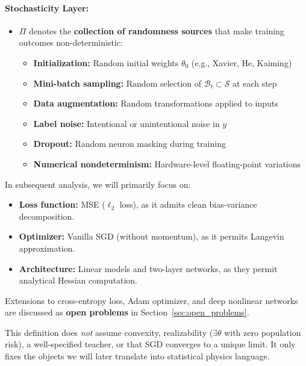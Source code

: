 \documentclass[
  journal=largetwo,
  year=2025,
  volume=37,
]{cup-journal}
\begin{document}
\begin{setting}
\paragraph{Stochasticity Layer:}
\begin{itemize}
    \item $\Pi$ denotes the \textbf{collection of randomness sources} that make training outcomes non-deterministic:
    \begin{itemize}
        \item \textbf{Initialization:} Random initial weights $\theta_0$ (e.g., Xavier, He, Kaiming)
        \item \textbf{Mini-batch sampling:} Random selection of $\mathcal{B}_t \subset \mathcal{S}$ at each step
        \item \textbf{Data augmentation:} Random transformations applied to inputs
        \item \textbf{Label noise:} Intentional or unintentional noise in $y$
        \item \textbf{Dropout:} Random neuron masking during training
        \item \textbf{Numerical nondeterminism:} Hardware-level floating-point variations
    \end{itemize}
\end{itemize}
\end{setting}

\begin{remark}
In subsequent analysis, we will primarily focus on:
\begin{itemize}
    \item \textbf{Loss function:} MSE ($\ell_2$ loss), as it admits clean bias-variance decomposition.
    \item \textbf{Optimizer:} Vanilla SGD (without momentum), as it permits Langevin approximation.
    \item \textbf{Architecture:} Linear models and two-layer networks, as they permit analytical Hessian computation.
\end{itemize}
Extensions to cross-entropy loss, Adam optimizer, and deep nonlinear networks are discussed as \textbf{open problems} in Section~\ref{sec:open_problems}.
\end{remark}

\begin{remark}
This definition does \emph{not} assume convexity, realizability ($\exists\theta$ with zero population risk), a well-specified teacher, or that SGD converges to a unique limit. It only fixes the objects we will later translate into statistical physics language.
\end{remark}
\end{document}
